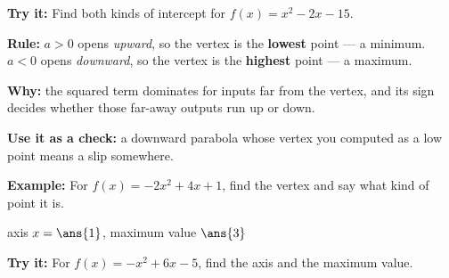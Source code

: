 \documentclass[12pt]{article}
\begin{document}
\begin{tryitbox}
\textbf{Try it:} \quad Find both kinds of intercept for $f(x) = x^2 - 2x - 15$.\\[2pt]
\end{tryitbox}


\begin{formulabox}
\textbf{Rule:} $a > 0$ opens \emph{upward}, so the vertex is the \textbf{lowest} point --- a minimum. $a< 0$ opens \emph{downward}, so the vertex is the \textbf{highest} point --- a maximum.\par
\textbf{Why:} the squared term dominates for inputs far from the vertex, and its sign decides whether those far-away outputs run up or down.\par
\textbf{Use it as a check:} a downward parabola whose vertex you computed as a low point means a slip somewhere.
\end{formulabox}

\begin{examplebox}
\textbf{Example:} \quad For $f(x) = -2x^2 + 4x + 1$, find the vertex and say what kind of point it is.

axis $x = \ans{1}$, \quad maximum value $\ans{3}$
\end{examplebox}

\begin{tryitbox}
\textbf{Try it:} \quad For $f(x) = -x^2 + 6x - 5$, find the axis and the maximum value.\\[2pt]
\end{tryitbox}
\end{document}
